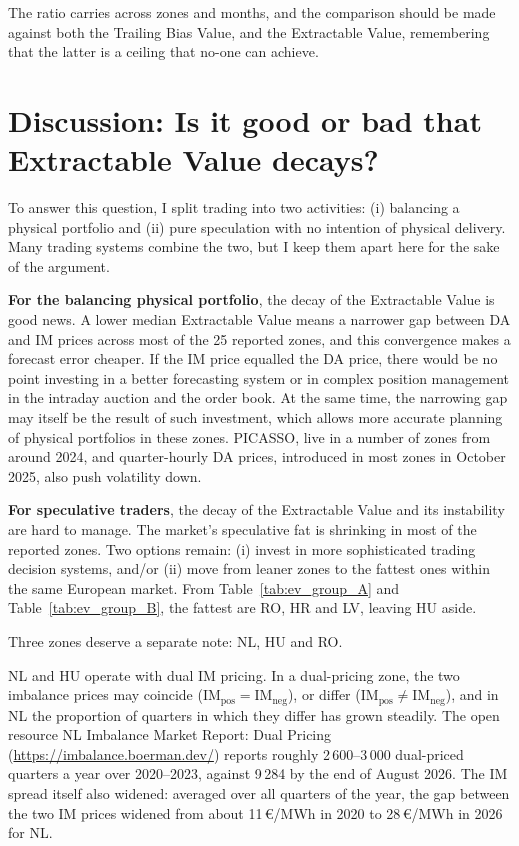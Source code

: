 \documentclass[11pt,a4paper]{article}
\newcommand{\IM}[1]{\ensuremath{\mathrm{IM}_{\mathrm{#1}}}}
\begin{document}
The ratio carries across zones and months, and the comparison should be made against both the Trailing Bias Value, and the Extractable Value, remembering that the latter is a ceiling that no-one can achieve.

\section{Discussion: Is it good or bad that Extractable Value decays?}

To answer this question, I split trading into two activities: (i) balancing a physical portfolio and (ii) pure speculation with no intention of physical delivery. Many trading systems combine the two, but I keep them apart here for the sake of the argument.

\textbf{For the balancing physical portfolio}, the decay of the Extractable Value is good news. A lower median Extractable Value means a narrower gap between DA and IM prices across most of the 25 reported zones, and this convergence makes a forecast error cheaper. If the IM price equalled the DA price, there would be no point investing in a better forecasting system or in complex position management in the intraday auction and the order book. At the same time, the narrowing gap may itself be the result of such investment, which allows more accurate planning of physical portfolios in these zones. PICASSO, live in a number of zones from around 2024, and quarter-hourly DA prices, introduced in most zones in October 2025, also push volatility down.

\textbf{For speculative traders}, the decay of the Extractable Value and its instability are hard to manage. The market's speculative fat is shrinking in most of the reported zones. Two options remain: (i) invest in more sophisticated trading decision systems, and/or (ii) move from leaner zones to the fattest ones within the same European market. From Table~\ref{tab:ev_group_A} and Table~\ref{tab:ev_group_B}, the fattest are RO, HR and LV, leaving HU aside.

Three zones deserve a separate note: NL, HU and RO.

NL and HU operate with dual IM pricing. In a dual-pricing zone, the two imbalance prices may coincide ($\IM{pos} = \IM{neg}$), or differ ($\IM{pos} \neq \IM{neg}$), and in NL the proportion of quarters in which they differ has grown steadily. The open resource NL Imbalance Market Report: Dual Pricing (\url{https://imbalance.boerman.dev/}) reports roughly 2\,600--3\,000 dual-priced quarters a year over 2020--2023, against 9\,284 by the end of August 2026. The IM spread itself also widened: averaged over all quarters of the year, the gap between the two IM prices widened from about 11\,\euro/MWh in 2020 to 28\,\euro/MWh in 2026 for NL. 
\end{document}
